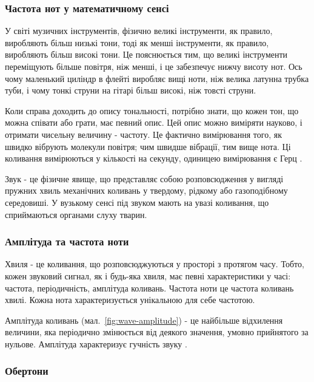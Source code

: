 \subsubsection{Частота нот у математичному сенсі}

У світі музичних інструментів, фізично великі інструменти, як правило, виробляють більш низькі тони, тоді як менші інструменти, як правило, виробляють більш високі тони. Це пояснюється тим, що великі інструменти переміщують більше повітря, ніж менші, і це забезпечує нижчу висоту нот. Ось чому маленький циліндр в флейті виробляє вищі ноти, ніж велика латунна трубка туби, і чому тонкі струни на гітарі більш високі, ніж товсті струни.

Коли справа доходить до опису тональності, потрібно знати, що кожен тон, що можна
співати або грати, має певний опис. Цей опис можно виміряти науково, і отримати чисельну величину - частоту. Це фактично вимірювання того, як швидко вібрують молекули повітря; чим швидше вібрації, тим вище нота. Ці коливання вимірюються у кількості на секунду, одиницею вимірювання є Герц \cite{miller2005complete}.

Звук - це фізичне явище, що представляє собою розповсюдження у вигляді пружних хвиль механічних коливань у твердому, рідкому або газоподібному середовиші. У вузькому сенсі під звуком мають на увазі коливання, що сприймаються органами слуху тварин.

\subsubsection{Амплітуда та частота ноти}

Хвиля - це коливання, що розповсюджуються у просторі з протягом часу. Тобто, кожен звуковий сигнал, як і будь-яка хвиля, має певні характеристики у часі: частота, періодичність, амплітуда коливань.  Частота ноти це частота коливань хвилі. Кожна нота характеризується унікальною для себе частотою.

Амплітуда коливань (мал.~\ref{fig:wave-amplitude}) - це найбільше відхилення величини, яка періодично змінюється від деякого значення, умовно прийнятого за нульове. Амплітуда характеризує гучність звуку \cite{яворський2007довідник}.



\subsubsection{Обертони}


